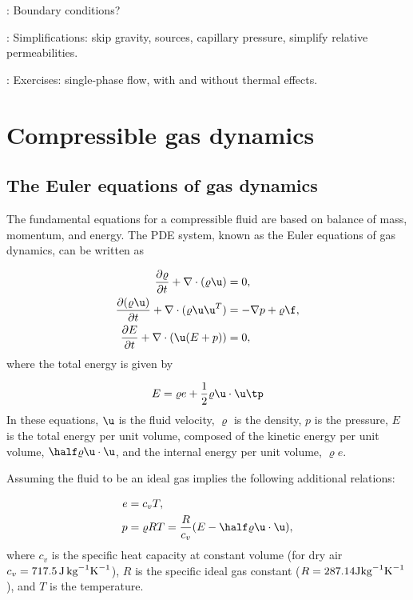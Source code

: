 \documentclass[graybox,envcountchap,sectrefs,final]{svmonodo}
\newcommand{\shortinlinecomment}[3]{{\color{red}{\bf #1}: #2}}
\begin{document}
\shortinlinecomment{hpl 25}{ Boundary conditions? }{ Boundary conditions? }

\shortinlinecomment{hpl 26}{ Simplifications: skip gravity, sources, capillary pressure, simplify relative permeabilities. }{ Simplifications: skip gravity, sources, }

\shortinlinecomment{hpl 27}{ Exercises: single-phase flow, with and without thermal effects. }{ Exercises: single-phase flow, with }

\section{Compressible gas dynamics}
\label{scale:gasdyn}

\subsection{The Euler equations of gas dynamics}
\label{scale:Euler_eqs}



The fundamental equations for a compressible fluid are based on balance
of mass, momentum, and energy. The PDE system, known as the Euler
equations of gas dynamics, can be written as

\begin{align}
\frac{\partial\varrho}{\partial t} + \nabla\cdot(\varrho\u) &= 0,
\label{scale:Euler_eqs:mass}\\ 
\frac{\partial(\varrho\u)}{\partial t} + \nabla\cdot(\varrho\u\u^T) &= -\nabla p + \varrho \f,
\label{scale:Euler_eqs:mom}\\ 
\frac{\partial E}{\partial t} + \nabla\cdot(\u(E+p)) &= 0,
\label{scale:Euler_eqs:energy}
\end{align}
where the total energy is given by

\begin{equation}
E = \varrho e + \frac{1}{2}\varrho\u\cdot\u\tp
\label{scale:Euler_eqs:E}
\end{equation}
In these equations, $\u$ is the fluid velocity, $\varrho$ is the density,
$p$ is the pressure, $E$ is the total energy per unit volume, composed
of the kinetic energy per unit volume, $\half\varrho \u\cdot\u$, and the
internal energy per unit volume, $\varrho e$.

Assuming the fluid to be an ideal gas implies the following additional
relations:

\begin{align}
e &= c_v T,
\label{scale:Euler_eqs:e}\\ 
p &= \varrho RT = \frac{R}{c_v}(E-\half\varrho \u\cdot\u),
\label{scale:Euler_eqs:p}
\end{align}
where $c_v$ is the specific heat capacity at constant volume (for dry air
$c_v = 717.5\, \hbox{J}\,\hbox{kg}^{-1}\hbox{K}^{-1}$),
$R$ is the specific ideal gas constant
($R=287.14 \hbox{J}\hbox{kg}^{-1}\hbox{K}^{-1}$), and $T$ is the temperature.
\end{document}

